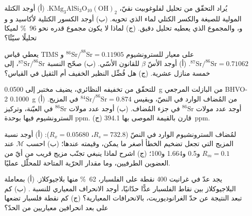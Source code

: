 \begin{exercise}[$\star\star$]\label{exo:b2:field-lab-methods-2:7}
يُراد التحقّق من تحليل  لفلوغوبيت نقيّ، $\mathrm{KMg_3AlSi_3O_{10}(OH)_2}$.
(أ) أوجد الكتلة المولية للصيغة والكسر الكتلي لماء  الذي تحويه. (ب) أوجد
الكسور الكتلية لأكاسيد  و و و، والمجموع الذي يعطيه
تحليل دقيق. (ج) لماذا لا يكون مجموع قدره نحو \qty{96}{\percent} لميكا تحليلًا سيّئًا؟
\end{exercise}

\begin{exercise}[$\star\star$]\label{exo:b2:field-lab-methods-2:8}
يعطي قياس TIMS على معيار للسترونشيوم $^{86}\mathrm{Sr}/^{88}\mathrm{Sr} = 0.11905$
و$^{87}\mathrm{Sr}/^{86}\mathrm{Sr} = 0.71062$. (أ) أوجد الأسّ $\beta$ للقانون الأسّي.
(ب) صحّح النسبة $^{87}\mathrm{Sr}/^{86}\mathrm{Sr}$، إلى خمسة منازل عشرية. (ج) هل فُضِّل النظير الخفيف أم
الثقيل في القياس؟
\end{exercise}

\begin{exercise}[$\star\star$]\label{exo:b2:field-lab-methods-2:9}
للتحقّق من تخفيفه النظائري، يضيف مختبر إلى \qty{0.0500}{g} من البازلت المرجعي BHVO-2
\qty{0.1000}{g} من المُضاف الوارد في النصّ، ويقيس $^{84}\mathrm{Sr}/^{86}\mathrm{Sr} =
0.874$ في المزيج. (أ) أوجد عدد مولات $^{86}\mathrm{Sr}$ في جزء المُضاف. (ب) أوجد
عدد مولات $^{86}\mathrm{Sr}$ في العيّنة، وتركيز السترونشيوم فيها بوحدة \unit{ppm}. (ج) قارن بالقيمة
الموصى بها \qty{394.1}{ppm}.
\end{exercise}

\begin{exercise}[$\star\star\star$]\label{exo:b2:field-lab-methods-2:10}
لمُضاف السترونشيوم الوارد في النصّ ($R_s = 732.8$، $R_x = 0.05680$): (أ) أوجد نسبة المزيج
التي تجعل تضخيم الخطأ أصغر ما يمكن، وقيمته عندها؛ (ب) احسب $\mathcal M$ عند
$R_m = 0.1$ و0.5 و1.664 و100؛ (ج) اشرح لماذا ينبغي تجنّب مزيج قريب من أيّ من العضوين الطرفيين،
وما مقدار الحرّية المتاحة للمحلّل عمليًا.
\end{exercise}

\begin{exercise}[$\star\star\star$]\label{exo:b2:field-lab-methods-2:11}
يجد عدّ في غرانيت 400 نقطة على الفلسبار، \qty{62}{\percent} منها بلاجيوكلاز. (أ) بمعاملة
البلاجيوكلاز بين نقاط الفلسبار عدًّا حدّانيًا، أوجد الانحراف المعياري للنسبة
. (ب) كم تبعد النتيجة عن حدّ الغرانوديوريت، بالانحرافات المعيارية؟ (ج) كم
نقطة فلسبار تضعها على بعد انحرافين معياريين من الحدّ؟
\end{exercise}

